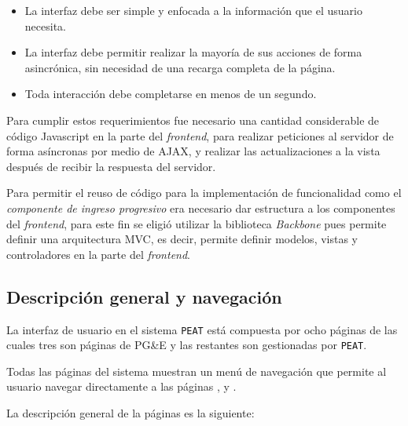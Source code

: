 \begin{itemize}
\item La interfaz debe ser simple y enfocada a la información que el
  usuario necesita.
\item La interfaz debe permitir realizar la mayoría de sus
  acciones de forma asincrónica, sin necesidad de una recarga completa de
  la página.
\item Toda interacción debe completarse en menos de un segundo.
\end{itemize}

Para cumplir estos requerimientos fue necesario una cantidad considerable
de código Javascript en la parte del \textit{frontend}, para realizar peticiones
al servidor de forma asíncronas por medio de AJAX, y realizar las actualizaciones
a la vista después de recibir la respuesta del servidor.

Para permitir el reuso de código para la implementación de funcionalidad como
el \textit{componente de ingreso progresivo} era necesario dar estructura a los
componentes del \textit{frontend}, para este fin se eligió utilizar la biblioteca
\textit{Backbone} pues permite definir una arquitectura MVC, es decir, permite
definir modelos, vistas y controladores en la parte del \textit{frontend}.

\subsection{Descripción general y navegación}

La interfaz de usuario en el sistema \texttt{PEAT} está compuesta por ocho páginas
de las cuales tres son páginas de PG\&E y las restantes son gestionadas por
\texttt{PEAT}.

Todas las páginas del sistema muestran un menú de navegación que permite al
usuario navegar directamente a las páginas ,
 y .

La descripción general de la páginas es la siguiente:

